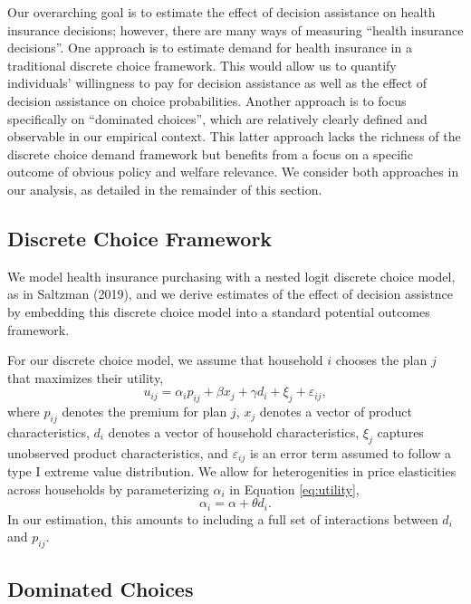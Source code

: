 \documentclass[
  12pt,
]{article}
\begin{document}
Our overarching goal is to estimate the effect of decision assistance on health insurance decisions; however, there are many ways of measuring ``health insurance decisions''. One approach is to estimate demand for health insurance in a traditional discrete choice framework. This would allow us to quantify individuals' willingness to pay for decision assistance as well as the effect of decision assistance on choice probabilities. Another approach is to focus specifically on ``dominated choices'', which are relatively clearly defined and observable in our empirical context. This latter approach lacks the richness of the discrete choice demand framework but benefits from a focus on a specific outcome of obvious policy and welfare relevance. We consider both approaches in our analysis, as detailed in the remainder of this section.

\hypertarget{discrete-choice-framework}{%
\subsection{Discrete Choice Framework}\label{discrete-choice-framework}}

We model health insurance purchasing with a nested logit discrete choice model, as in Saltzman (2019), and we derive estimates of the effect of decision assistnce by embedding this discrete choice model into a standard potential outcomes framework.

For our discrete choice model, we assume that household \(i\) chooses the plan \(j\) that maximizes their utility,
\begin{equation}
u_{ij} = \alpha_{i}p_{ij} + \beta x_{j} + \gamma d_{i} + \xi_{j} + \varepsilon_{ij}, \label{eq:utility}
\end{equation}
where \(p_{ij}\) denotes the premium for plan \(j\), \(x_{j}\) denotes a vector of product characteristics, \(d_{i}\) denotes a vector of household characteristics, \(\xi_{j}\) captures unobserved product characteristics, and \(\varepsilon_{ij}\) is an error term assumed to follow a type I extreme value distribution. We allow for heterogenities in price elasticities across households by parameterizing \(\alpha_{i}\) in Equation \eqref{eq:utility}, \[\alpha_{i} = \alpha + \theta d_{i}.\] In our estimation, this amounts to including a full set of interactions between \(d_{i}\) and \(p_{ij}\).

\hypertarget{dominated-choices}{%
\subsection{Dominated Choices}\label{dominated-choices}}
\end{document}
